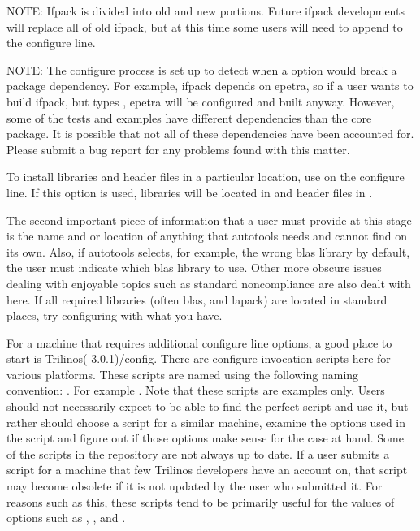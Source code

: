 \documentclass[12pt,relax]{TrilinosDevGuide}
\begin{document}
NOTE: Ifpack is divided into old and new portions.  Future ifpack developments 
will replace all of old ifpack, but at this time some users will need to append
 to the configure line.

NOTE: The configure process is set up to detect when a 
 option would break a package dependency.  
For example, ifpack depends on epetra, so if a user wants to build ifpack, but 
types , epetra will be configured and built 
anyway.  However, some of the tests and examples have different dependencies 
than the core package.  It is possible that not all of these dependencies have 
been accounted for.  Please submit a bug report for any problems found with 
this matter.

	To install libraries and header files in a particular location, 
use  on the configure line.  If this option is 
used, libraries will be located in  and header files in 
.

	The second important piece of information that a user must provide at 
this stage is the name and or location of anything that autotools needs and 
cannot find on its own.  Also, if autotools selects, for example, the wrong 
blas library by default, the user must indicate which blas library to use.  
Other more obscure issues dealing with enjoyable topics such as standard 
noncompliance are also dealt with here.  If all required libraries (often 
blas, and lapack) are located in standard places, try configuring with what 
you have.

	For a machine that requires additional configure line options, a good 
place to start is Trilinos(-3.0.1)/config.  There are configure invocation 
scripts here for various platforms.  These scripts are named using the 
following naming convention:
.
For example .  Note that these scripts are examples 
only.  Users should not necessarily expect to be able to find the perfect 
script and use it, but rather should choose a script for a similar machine, 
examine the options used in the script and figure out if those options make 
sense for the case at hand.  Some of the scripts in the repository are not 
always up to date.  If a user submits a script for a machine that few Trilinos 
developers have an account on, that script may become obsolete if it is not 
updated by the user who submitted it.  For reasons such as this, these scripts 
tend to be primarily useful for the values of options such as , 
, and .  
\end{document}

